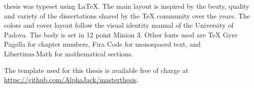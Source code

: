 
\cleardoublepage

\thispagestyle{empty}


{%
 
 
 \centering
 \setlength{\parindent}{0mm}
 
 \begin{minipage}{110mm}
  \hfill
  \hfill
  \vspace{10mm}

   thesis was typeset using \LaTeX{}.
  The main layout is inspired by the beuty, quality and variety of the dissertations shared by the \TeX{} community over the years.
  The colors and cover layout follow the visual identity manual of the University of Padova.
  The body is set in 12 point Minion 3.
  Other fonts used are {\TitleNumberFont\TeX{} Gyre Pagella} for chapter numbers, 
  {\small\ttfamily Fira Code} for monospaced text, 
  and \(\mathrm{Libertinus\ Math}\) for mathematical sections.

  The template used for this thesis is available free of charge at \url{https://github.com/AlphaJack/masterthesis}.
 \end{minipage}
 \vspace{10mm}
 
 
 \null

} %


\clearpage
